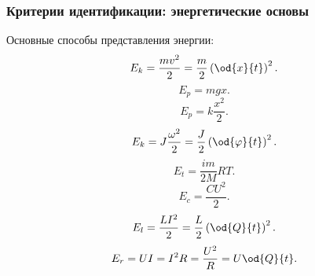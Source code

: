 \documentclass[10pt,utf8]{beamer}
\begin{document}
%
%
%
%

%
%
%
%
%



\begin{frame}
  \frametitle{Критерии идентификации: энергетические основы}

Основные способы представления энергии:
%
\begin{equation}
  E_k = \frac{mv^2}{2} = \frac{m}{2} \left( \od{x}{t} \right)^2.
  \label{atu:eq:Ek_v}
\end{equation}
%
%
\begin{equation}
  E_p = m g x .
  \label{atu:eq:Ep_g}
\end{equation}
%
\begin{equation}
  E_p = k \frac{x^2}{2} .
  \label{atu:eq:Ep_spring}
\end{equation}
%
\begin{equation}
  E_k = J \frac{\omega^2}{2} = \frac{J}{2} \left( \od{\varphi}{t} \right)^2 .
  \label{atu:eq:Ek_spin}
\end{equation}
%
\begin{equation}
  E_t = \frac{im}{2M} RT.
  \label{atu:eq:Et}
\end{equation}
%
\begin{equation}
  E_c = \frac{C U^2}{2}.
  \label{atu:eq:Ec}
\end{equation}
%
\begin{equation}
  E_l = \frac{L I^2}{2} = \frac{L}{2} \left( \od{Q}{t}\right)^2 .
  \label{atu:eq:El}
\end{equation}
%
\begin{equation}
  E_r = U I = I^2 R = \frac{U^2}{R} = U \od{Q}{t} .
  \label{atu:eq:Er}
\end{equation}

\end{frame}



\end{document}
